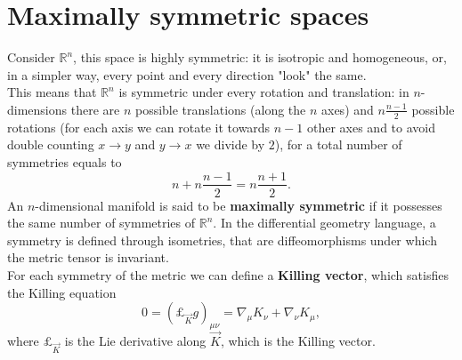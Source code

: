 \section{Maximally symmetric spaces}\label{app:MaxSymm}
Consider $\mathbb{R}^n$, this space is highly symmetric: it is isotropic and homogeneous, or, in a simpler way, every point and every direction "look" the same.\\
This means that $\mathbb{R}^n$ is symmetric under every rotation and translation: in $n$-dimensions there are $n$ possible translations (along the $n$ axes) and $n\frac{n-1}{2}$ possible rotations (for each axis we can rotate it towards $n-1$ other axes and to avoid double counting $x\rightarrow y$ and $y\rightarrow x$ we divide by $2$), for a total number of symmetries equals to $$n+n\frac{n-1}{2}=n\frac{n+1}{2}.$$ 
An $n$-dimensional manifold is said to be \textbf{maximally symmetric} if it possesses the same number of symmetries of $\mathbb{R}^n$. In the differential geometry language, a symmetry is defined through isometries, that are diffeomorphisms under which the metric tensor is invariant.\\
For each symmetry of the metric we can define a \textbf{Killing vector}, which satisfies the Killing equation 
\begin{equation}
    0=(\pounds_{\vec K}g)_{\mu\nu}=\nabla_\mu K_\nu+\nabla_\nu K_\mu, \label{KillingEq}
\end{equation}
where $\pounds_{\vec{K}}$ is the Lie derivative along $\vec K$, which is the Killing vector.

